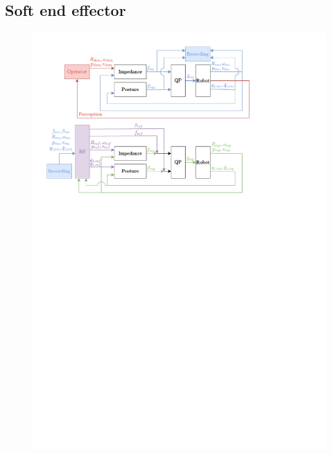 \documentclass[a4paper, 10pt, conference]{ieeeconf}
\begin{document}
    \subsection{Soft end effector}
     \begin{figure}[h]
      \centering

    \includegraphics[trim={1cm 23.3cm 5cm 1cm}, clip]{Graphics/qp.pdf}

\end{figure}
\end{document}
